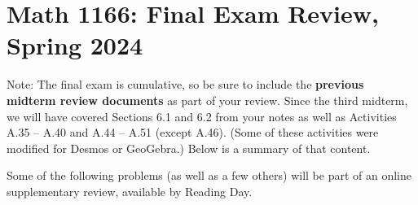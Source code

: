\newpage

\section{Math 1166: Final Exam Review, Spring 2024}

Note:  The final exam is cumulative, so be sure to include the \textbf{previous midterm review documents} as part of your review.  
Since the third midterm, we will have covered Sections 6.1 and 6.2 from your notes as well as Activities A.35 -- A.40 and A.44 -- A.51 (except A.46).  (Some of these activities were modified for Desmos or GeoGebra.) Below is a summary of that content.  

Some of the following problems (as well as a few others) will be part of an online supplementary review, available by Reading Day.  



